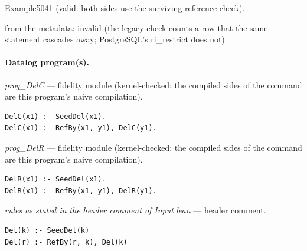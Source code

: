 \documentclass[10pt]{article}
\begin{document}
\begin{description}[leftmargin=2.6cm,style=nextline,itemsep=1pt]
\item[Twin] Example5041 (valid: both sides use the surviving-reference check).

\item[Obstruction note] from the metadata: invalid (the legacy check counts a row that the same statement cascades away; PostgreSQL's ri\_restrict does not)

\end{description}

\paragraph{Datalog program(s).}

{\raggedright\textit{prog\_DelC} --- fidelity module (kernel-checked: the compiled sides of the command are this program's naive compilation).\par}

\begin{Verbatim}[fontsize=\scriptsize,breaklines=true,breakanywhere=true,frame=single,framesep=1.5mm]
DelC(x1) :- SeedDel(x1).
DelC(x1) :- RefBy(x1, y1), DelC(y1).
\end{Verbatim}

{\raggedright\textit{prog\_DelR} --- fidelity module (kernel-checked: the compiled sides of the command are this program's naive compilation).\par}

\begin{Verbatim}[fontsize=\scriptsize,breaklines=true,breakanywhere=true,frame=single,framesep=1.5mm]
DelR(x1) :- SeedDel(x1).
DelR(x1) :- RefBy(x1, y1), DelR(y1).
\end{Verbatim}

{\raggedright\textit{rules as stated in the header comment of Input.lean} --- header comment.\par}

\begin{Verbatim}[fontsize=\scriptsize,breaklines=true,breakanywhere=true,frame=single,framesep=1.5mm]
Del(k) :- SeedDel(k)
Del(r) :- RefBy(r, k), Del(k)
\end{Verbatim}
\end{document}
